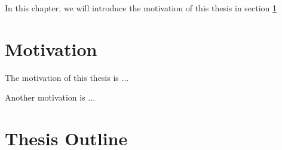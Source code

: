 
In this chapter, we will introduce the motivation of this thesis in section \ref{section:motivation}

\section{Motivation} \label{section:motivation}

The motivation of this thesis is ...

Another motivation is ...

\section{Thesis Outline} \label{section:thesis outline}